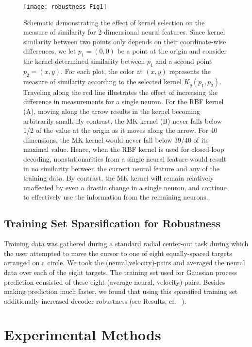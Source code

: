 \begin{figure}[h]
\centering
\texttt{[image: robustness\_Fig1]}
\caption[Schematic demonstrating the effect of kernel selection on the measure of similarity for 2-dimensional neural features]{Schematic demonstrating the effect of kernel selection on the measure of similarity for 2-dimensional neural features.  Since kernel similarity between two points only depends on their coordinate-wise differences, we let $p_1=(0,0)$ be a point at the origin and consider the kernel-determined similarity between $p_1$ and a second point $p_2=(x,y)$.  For each plot, the color at $(x,y)$ represents the measure of similarity according to the selected kernel $K_{\tilde\theta}(p_1,p_2)$.  Traveling along the red line illustrates the effect of increasing the difference in measurements for a single neuron. For the RBF kernel (A), moving along the arrow results in the kernel becoming arbitrarily small. By contrast, the MK kernel (B) never falls below 1/2 of the value at the origin as it moves along the arrow. For 40 dimensions, the MK kernel would never fall below 39/40 of its maximal value. Hence, when the RBF kernel is used for closed-loop decoding, nonstationarities from a single neural feature would result in no similarity between the current neural feature and any of the training data. By contrast, the MK kernel will remain relatively unaffected by even a drastic change in a single neuron, and continue to effectively use the information from the remaining neurons.}
\label{fig:kernel_illustration}
\end{figure}

\subsection{Training Set Sparsification for Robustness}

Training data was gathered during a standard radial center-out task during which the user attempted to move the cursor to one of eight equally-spaced targets arranged on a circle.  We took the (neural,velocity)-pairs and averaged the neural data over each of the eight targets.  The training set used for Gaussian process prediction consisted of these eight (average neural, velocity)-pairs.  Besides making prediction much faster, we found that using this sparsified training set additionally increased decoder robustness (see Results, cf. ~\cite{Sne05}).  

\section{Experimental Methods} 

